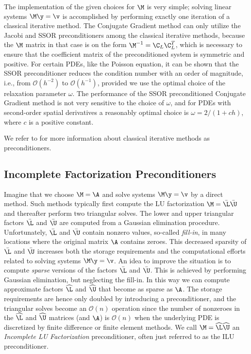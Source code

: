 The implementation of the given choices for $\M$ is very simple;
solving linear systems $\M\y =\v$ is accomplished by performing
exactly one iteration of a classical iterative method.
The Conjugate Gradient
method can only utilize the Jacobi and SSOR preconditioners among the classical
iterative methods, because the $\M$ matrix in that case is on the form
$\M^{-1}=\C_L\C_L^T$, which is necessary to
ensure that the coefficient matrix of the preconditioned system is
symmetric and positive.
For certain PDEs, like the Poisson equation, it can be shown that the SSOR
preconditioner reduces the condition number with an order of magnitude,
i.e., from $\mathcal{O}(h^{-2})$ to $\mathcal{O}(h^{-1})$,
provided we use the optimal choice of the relaxation parameter $\omega$.
The performance of the SSOR preconditioned Conjugate Gradient method is
not very sensitive to the choice of $\omega$, and for PDEs with
second-order spatial derivatives
a reasonably optimal choice is $\omega =2/(1+ch)$, where $c$ is a positive constant.


We refer to \cite{linalgtemplates93,BruBok} for more information about
classical iterative methods as preconditioners.

\subsection{Incomplete Factorization Preconditioners}
\label{linalg:RILU:def}
Imagine that we choose $\M =\A$ and solve systems $\M\y =\v$ by a direct
method. Such methods typically first compute the LU factorization
$\M =\bar \L\bar \U$ and thereafter
perform two triangular solves. The lower and upper
triangular factors $\bar\L$ and
$\bar\U$ are computed from a Gaussian elimination procedure.
Unfortunately, $\bar\L$ and $\bar\U$ contain nonzero values, so-called
\emph{fill-in}, in many locations where the original matrix $\A$ contains
zeroes. This decreased sparsity of $\bar\L$ and $\bar\U$ increases
both the storage requirements and the computational efforts related to
solving systems $\M\y =\v$.
An idea to improve the situation is to compute \emph{sparse} versions of
the  factors
$\bar\L$ and $\bar\U$. This is achieved by performing Gaussian
elimination, but neglecting the fill-in. In this way
we can compute approximate factors $\widehat\L$ and $\widehat\U$
that become as sparse as $\A$.
The storage requirements are hence only doubled by introducing a
preconditioner, and the
triangular solves become an
$\mathcal{O}(n)$ operation since the number of nonzeroes in
the $\widehat\L$
and $\widehat\U$ matrices (and $\A$) is $\mathcal{O}(n)$ when the underlying PDE
is discretized by finite difference or finite element methods.
We call $\M =\widehat\L\widehat\U$ an \emph{Incomplete LU Factorization}
preconditioner, often just referred to as the ILU preconditioner.

